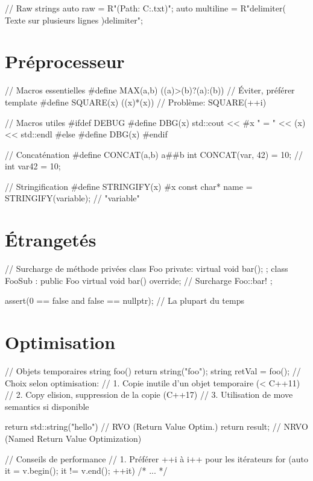\documentclass{article}
\begin{document}
\begin{multicols*}{4}
\begin{cppcode}
// Raw strings
auto raw = R"(Path: C:\Users\Name\File.txt)";
auto multiline = R"delimiter(
    Texte sur
    plusieurs lignes
)delimiter";
\end{cppcode}

\section*{Préprocesseur}
\begin{cppcode}
// Macros essentielles
#define MAX(a,b) ((a)>(b)?(a):(b))  // Éviter, préférer template
#define SQUARE(x) ((x)*(x))         // Problème: SQUARE(++i)

// Macros utiles
#ifdef DEBUG
#define DBG(x) std::cout << #x " = " << (x) << std::endl
#else
#define DBG(x)
#endif

// Concaténation
#define CONCAT(a,b) a##b
int CONCAT(var, 42) = 10; // int var42 = 10;

// Stringification
#define STRINGIFY(x) #x
const char* name = STRINGIFY(variable); // "variable"
\end{cppcode}

\section*{Étrangetés}

\begin{cppcode}
// Surcharge de méthode privées
class Foo {
private:
   virtual void bar();
};
class FooSub : public Foo {
   virtual void bar() override;      // Surcharge Foo::bar!
};

assert(0 == false and false == nullptr); // La plupart du temps
\end{cppcode}

\section*{Optimisation}
\begin{cppcode}
// Objets temporaires
string foo() { return string("foo"); }
string retVal = foo(); // Choix selon optimisation:
// 1. Copie inutile d'un objet temporaire (< C++11)
// 2. Copy elision, suppression de la copie (C++17)
// 3. Utilisation de move semantics si disponible

return std::string("hello") // RVO (Return Value Optim.)
return result; // NRVO (Named Return Value Optimization)

// Conseils de performance
// 1. Préférer ++i à i++ pour les itérateurs
for (auto it = v.begin(); it != v.end(); ++it) { /* ... */ }


\end{cppcode}
\end{multicols*}
\end{document}
